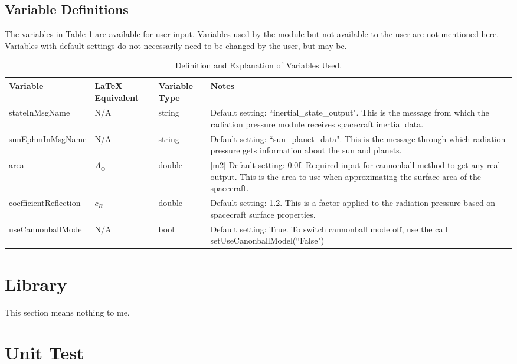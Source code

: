 \documentclass[]{BasiliskReportMemo}
\begin{document}
\subsection{Variable Definitions}
The variables in Table \ref{tabular:vars} are available for user input. Variables used by the module but not available to the user are not mentioned here. Variables with default settings do not necessarily need to be changed by the user, but may be.
	\begin{table}[H]
		\caption{Definition and Explanation of Variables Used.}
		\label{tab:errortol}
		\centering \fontsize{10}{10}\selectfont
		\begin{tabular}{ | m{3cm}| m{3cm} | m{3cm} | m{6cm} |} %
			\hline
			\textbf{Variable}   		& \textbf{LaTeX Equivalent} 	&		\textbf{Variable Type} & \textbf{Notes} \\ \hline
			stateInMsgName			&N/A		   							    & string 								& Default setting: ``inertial\_state\_output". This is the message from which the radiation pressure module receives spacecraft inertial data.\\ \hline
			sunEphmInMsgName	& N/A 										& string 								& Default setting: ``sun\_planet\_data". This is the message through which radiation pressure gets information about the sun and planets.\\ \hline
			area 						  	  & $A_{\odot}$							    & double 								& [m2] Default setting: 0.0f. Required input for cannonball method to get any real output. This is the area to use when approximating the surface area of the spacecraft.\\ \hline
			coefficientReflection 	  & $c_{R}$ 								& double 								& Default setting: 1.2. This is a factor applied to the radiation pressure based on spacecraft surface properties.\\ \hline
			useCannonballModel	   & N/A 									   & bool 									& Default setting: True. To switch cannonball mode off, use the call setUseCanonballModel(``False")\\ \hline
		\end{tabular}
	\label{tabular:vars}
	\end{table}
\section{Library}
This section means nothing to me.

\section{Unit Test}
\end{document}
